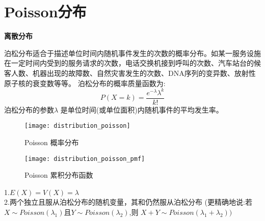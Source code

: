 \documentclass[openany]{book}
\begin{document}
\section{Poisson分布}
\label{sec.distribution.poisson}
\textbf{离散分布}

泊松分布适合于描述单位时间内随机事件发生的次数的概率分布。如某一服务设施在一定时间内受到的服务请求的次数，电话交换机接到呼叫的次数、汽车站台的候客人数、机器出现的故障数、自然灾害发生的次数、DNA序列的变异数、放射性原子核的衰变数等等。
泊松分布的概率质量函数为:
$$
P(X=k)={\frac  {e^{{-\lambda }}\lambda ^{k}}{k!}}
$$
泊松分布的参数$\lambda$ 是单位时间(或单位面积)内随机事件的平均发生率。
\begin{figure}[htbp]
  \centering
  \texttt{[image: distribution\_poisson]}\\
  \caption{Poisson 概率分布}\label{fig.distribution.poisson}
\end{figure}

\begin{figure}[htbp]
  \centering
  \texttt{[image: distribution\_poisson\_pmf]}\\
  \caption{Poisson 累积分布函数}\label{fig.distribution.poisson.pmf}
\end{figure}
	
1.$E(X)=V(X)=\lambda$ \\
\noindent
2.两个独立且服从泊松分布的随机变量，其和仍然服从泊松分布 (更精确地说:若$X \sim Poisson(\lambda_1)$且$Y \sim Poisson(\lambda_2)$,则 $X+Y \sim Poisson(\lambda_1+\lambda_2))$
\end{document}
